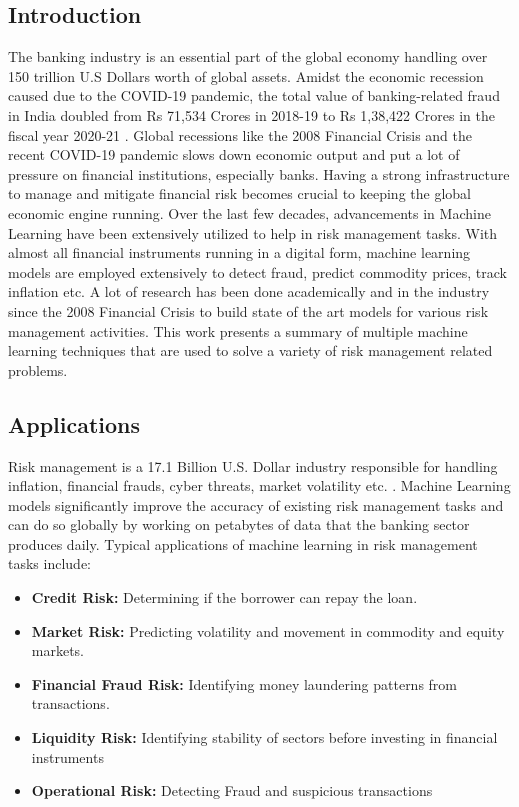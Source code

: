 \documentclass[a4paper, 12pt]{article}
\begin{document}
\begin{center}
\newpage
{}
\setcounter{page}{1}
\section{\centering Introduction}
\end{center}
\vskip 0.25in
The banking industry is an essential part of the global economy handling over 150 trillion U.S Dollars worth of global assets. Amidst the economic recession caused due to the COVID-19 pandemic, the total value of banking-related fraud in India doubled from Rs 71,534 Crores in 2018-19 to Rs 1,38,422 Crores in the fiscal year  2020-21 \cite{rbi21}. Global recessions like the 2008 Financial Crisis and the recent COVID-19 pandemic slows down economic output and put a lot of pressure on financial institutions, especially banks. Having a strong infrastructure to manage and mitigate financial risk becomes crucial to keeping the global economic engine running.
\vskip 0.2in
\noindent
Over the last few decades, advancements in Machine Learning have been extensively utilized to help in risk management tasks. With almost all financial instruments running in a digital form, machine learning models are employed extensively to detect fraud, predict commodity prices, track inflation etc. A lot of research has been done academically and in the industry since the 2008 Financial Crisis to build state of the art models for various risk management activities. This work  presents a summary of multiple machine learning techniques that are used to solve a variety of risk management related problems.
\vskip 0.2in
\subsection{Applications}
Risk management is a 17.1 Billion U.S. Dollar industry responsible for handling inflation, financial frauds, cyber threats, market volatility etc. \cite{bcc17}. Machine Learning models significantly improve the accuracy of existing risk management tasks and can do so globally by working on petabytes of data that the banking sector produces daily. Typical applications of machine learning in risk management tasks include:

\begin{itemize}
  \item \textbf{Credit Risk:} Determining if the borrower can repay the loan.
  \item \textbf{Market Risk:} Predicting volatility and movement in commodity and equity markets.
  \item \textbf{Financial Fraud Risk:} Identifying money laundering patterns from transactions.
  \item \textbf{Liquidity Risk:} Identifying stability of sectors before investing in financial instruments
  \item \textbf{Operational Risk:} Detecting Fraud and suspicious transactions
\end{itemize}
\end{document}
